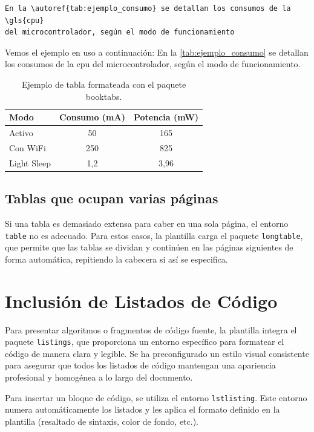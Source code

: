 \documentclass[11pt,a4paper]{book}
\begin{document}
\begin{verbatim}
En la \autoref{tab:ejemplo_consumo} se detallan los consumos de la \gls{cpu} 
del microcontrolador, según el modo de funcionamiento
\end{verbatim}

Vemos el ejemplo en uso a continuación: En la \autoref{tab:ejemplo_consumo} se detallan los consumos de la \gls{cpu} del microcontrolador, según el modo de funcionamiento.

\begin{table}
    \centering
    \caption{Ejemplo de tabla formateada con el paquete booktabs.}
    \label{tab:ejemplo_consumo}
    \begin{tabular}{lcc}
        \toprule
        \textbf{Modo} & \textbf{Consumo (mA)} & \textbf{Potencia (mW)} \\
        \midrule
        Activo & 50 & 165 \\
        Con WiFi & 250 & 825 \\
        Light Sleep & 1,2 & 3,96 \\
        \bottomrule
    \end{tabular}
\end{table}

\subsection{Tablas que ocupan varias páginas}
Si una tabla es demasiado extensa para caber en una sola página, el entorno \texttt{table} no es adecuado. Para estos casos, la plantilla carga el paquete \texttt{longtable}, que permite que las tablas se dividan y continúen en las páginas siguientes de forma automática, repitiendo la cabecera si así se especifica.

\section{Inclusión de Listados de Código}
\label{sec:listados_codigo}

Para presentar algoritmos o fragmentos de código fuente, la plantilla integra el paquete \texttt{listings}, que proporciona un entorno específico para formatear el código de manera clara y legible. Se ha preconfigurado un estilo visual consistente para asegurar que todos los listados de código mantengan una apariencia profesional y homogénea a lo largo del documento.

Para insertar un bloque de código, se utiliza el entorno \texttt{lstlisting}. Este entorno numera automáticamente los listados y les aplica el formato definido en la plantilla (resaltado de sintaxis, color de fondo, etc.).
\end{document}
